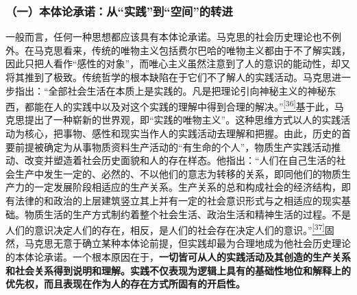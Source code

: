 \documentclass[UTF8, fontset = sourcesans, a4paper, oneside, zihao =
-4, scheme=chinese, no-math, space=true]{ctexbook}
\begin{document}
\subsubsection{\texorpdfstring{（一）本体论承诺：从``实践''到``空间''的转进}{（一）本体论承诺：从实践到空间的转进}}\label{part0010_split_002.htmlux5cux23d039}

一般而言，任何一种思想都应该具有本体论承诺。马克思的社会历史理论也不例外。在马克思看来，传统的唯物主义包括费尔巴哈的唯物主义都由于不了解实践，因此只把人看作``感性的对象''，而唯心主义虽然注意到了人的意识的能动性，却又将其推到了极致。传统哲学的根本缺陷在于它们不了解人的实践活动。马克思进一步指出：``全部社会生活在本质上是实践的。凡是把理论引向神秘主义的神秘东西，都能在人的实践中以及对这个实践的理解中得到合理的解决。''\protect\hypertarget{part0010_split_002.htmlux5cux23w36}{}{}\protect\hyperlink{part0010_split_002.htmlux5cux23m36}{\textsuperscript{{[}36{]}}}基于此，马克思提出了一种崭新的世界观，即``实践的唯物主义''。这种思维方式以人的实践活动为核心，把事物、感性和现实当作人的实践活动去理解和把握。由此，历史的首要前提被确定为从事物质资料生产活动的``有生命的个人''，物质生产实践活动推动、改变并塑造着社会历史面貌和人的存在样态。他指出：``人们在自己生活的社会生产中发生一定的、必然的、不以他们的意志为转移的关系，即同他们的物质生产力的一定发展阶段相适应的生产关系。生产关系的总和构成社会的经济结构，即有法律的和政治的上层建筑竖立其上并有一定的社会意识形式与之相适应的现实基础。物质生活的生产方式制约着整个社会生活、政治生活和精神生活的过程。不是人们的意识决定人们的存在，相反，是人们的社会存在决定人们的意识。''\protect\hypertarget{part0010_split_002.htmlux5cux23w37}{}{}\protect\hyperlink{part0010_split_002.htmlux5cux23m37}{\textsuperscript{{[}37{]}}}固然，马克思无意于确立某种本体论前提，但实践却最为合理地成为他社会历史理论的本体论承诺。一个根本原因在于，\textbf{一切皆可从人的实践活动及其创造的生产关系和社会关系得到说明和理解。实践不仅表现为逻辑上具有的基础性地位和解释上的优先权，而且表现在作为人的存在方式所固有的开启性。}
\end{document}
